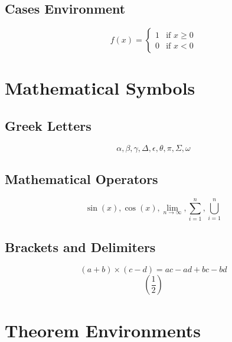 \documentclass{article} %
\begin{document}
\subsection{Cases Environment} %
\[ %
f(x) = %
\begin{cases} %
    1 & \text{if } x \geq 0 \\ %
    0 & \text{if } x < 0 %
\end{cases} %
\] %

\section{Mathematical Symbols} %

\subsection{Greek Letters} %
\[ \alpha, \beta, \gamma, \Delta, \epsilon, \theta, \pi, \Sigma, \omega \] %

\subsection{Mathematical Operators} %
\[ \sin(x), \cos(x), \lim_{n \to \infty}, \sum_{i=1}^{n},\bigcup_{i=1}^{n} \] %

\subsection{Brackets and Delimiters} %
\[ (a + b) \times (c - d) = ac - ad + bc - bd \] %
\[ \left( \frac{1}{2} \right) \] %

\section{Theorem Environments} %

\newtheorem{theorem}{Theorem} %
\end{document}
